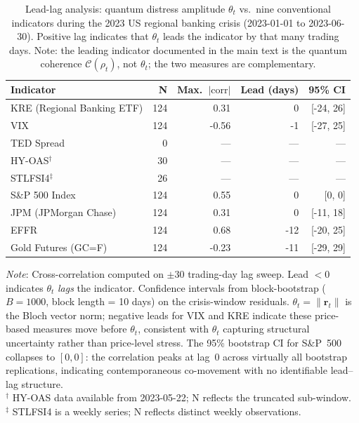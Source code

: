 \begin{table}[htbp]
\centering
\caption{Lead-lag analysis: quantum distress amplitude $\theta_t$ vs.\ nine conventional indicators during the 2023 US regional banking crisis (2023-01-01 to 2023-06-30). Positive lag indicates that $\theta_t$ leads the indicator by that many trading days. Note: the leading indicator documented in the main text is the quantum coherence $\mathcal{C}(\rho_t)$, not $\theta_t$; the two measures are complementary.}
\label{tab:lead-lag}
\begin{tabular}{lrrrr}
\hline
Indicator & N & Max.\ $|\text{corr}|$ & Lead (days) & 95\% CI \\
\hline
  KRE (Regional Banking ETF)     & 124 & 0.31 & 0 & [-24, 26] \\
  VIX                            & 124 & -0.56 & -1 & [-27, 25] \\
  TED Spread                     & 0 & --- & --- & --- \\
  HY-OAS$^{\dagger}$             & 30 & --- & --- & --- \\
  STLFSI4$^{\ddagger}$           & 26 & --- & --- & --- \\
  S\&P 500 Index                 & 124 & 0.55 & 0 & [0, 0] \\
  JPM (JPMorgan Chase)           & 124 & 0.31 & 0 & [-11, 18] \\
  EFFR                           & 124 & 0.68 & -12 & [-20, 25] \\
  Gold Futures (GC=F)            & 124 & -0.23 & -11 & [-29, 29] \\
\hline
\end{tabular}

\medskip
\footnotesize
\textit{Note}: Cross-correlation computed on $\pm 30$ trading-day lag sweep. Lead $< 0$ indicates $\theta_t$ \emph{lags} the indicator. Confidence intervals from block-bootstrap ($B=1000$, block length = 10 days) on the crisis-window residuals. $\theta_t = \|\mathbf{r}_t\|$ is the Bloch vector norm; negative leads for VIX and KRE indicate these price-based measures move before $\theta_t$, consistent with $\theta_t$ capturing structural uncertainty rather than price-level stress. The 95\% bootstrap CI for S\&P~500 collapses to $[0,0]$: the correlation peaks at lag~0 across virtually all bootstrap replications, indicating contemporaneous co-movement with no identifiable lead--lag structure.\\
$^{\dagger}$ HY-OAS data available from 2023-05-22; N reflects the truncated sub-window.\\
$^{\ddagger}$ STLFSI4 is a weekly series; N reflects distinct weekly observations.
\end{table}
